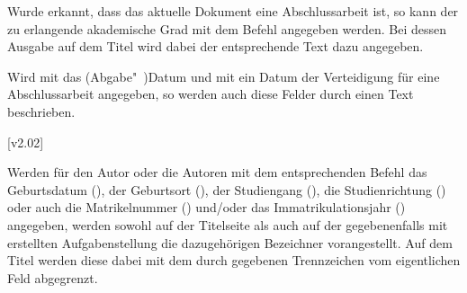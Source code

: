 \begin{DeclareEntity*}{}
\begin{DeclareEntity*}{}
\begin{DeclareEntity*}{}
\begin{Declaration}
Wurde erkannt, dass das aktuelle Dokument eine Abschlussarbeit ist, so kann der 
zu erlangende akademische Grad mit dem Befehl  angegeben 
werden. Bei dessen Ausgabe auf dem Titel wird dabei der entsprechende Text dazu 
angegeben.
%
\end{Declaration}

\begin{Declaration}
  {}
\begin{Declaration}
  {}

Wird mit  das (Abgabe"~)Datum und mit  ein Datum 
der Verteidigung für eine Abschlussarbeit angegeben, so werden auch diese 
Felder durch einen Text beschrieben.
%
\end{Declaration}
\end{Declaration}
%

\begin{Declaration}
  {}
\begin{Declaration}
  {}
\begin{Declaration}
  {}
\begin{Declaration}
  {}
\begin{Declaration}
  {}
\begin{Declaration}
  {}
  [v2.02]

Werden für den Autor oder die Autoren mit dem entsprechenden Befehl das 
Geburtsdatum (), der Geburtsort (), der 
Studiengang (), die Studienrichtung () oder 
auch die Matrikelnummer () und/oder das 
Immatrikulationsjahr () angegeben, werden sowohl auf 
der Titelseite als auch auf der gegebenenfalls mit  
erstellten Aufgabenstellung die dazugehörigen Bezeichner vorangestellt. Auf 
dem Titel werden diese dabei mit dem durch  gegebenen 
Trennzeichen vom eigentlichen Feld abgegrenzt.
%
\end{Declaration}
\end{Declaration}
\end{Declaration}
\end{Declaration}
\end{Declaration}
\end{Declaration}


\end{DeclareEntity*}
\end{DeclareEntity*}
\end{DeclareEntity*}
